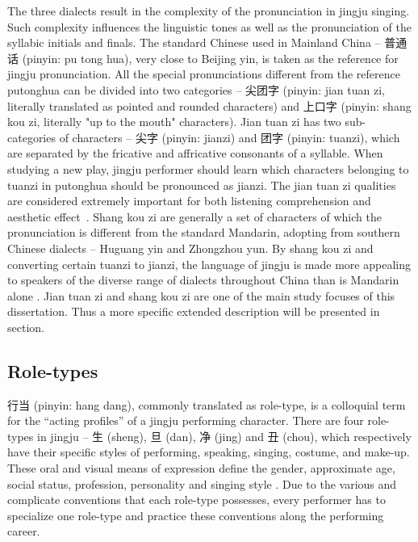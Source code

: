 The three dialects result in the complexity of the pronunciation in jingju singing. Such complexity influences the linguistic tones as well as the pronunciation of the syllabic initials and finals. The standard Chinese used in Mainland China -- 普通话 (pinyin: pu tong hua), very close to Beijing yin, is taken as the reference for jingju pronunciation. All the special pronunciations different from the reference putonghua can be divided into two categories -- 尖团字 (pinyin: jian tuan zi, literally translated as pointed and rounded characters) and 上口字 (pinyin: shang kou zi, literally "up to the mouth" characters). Jian tuan zi has two sub-categories of characters -- 尖字 (pinyin: jianzi) and 团字 (pinyin: tuanzi), which are separated by the fricative and affricative consonants of a syllable. When studying a new play, jingju performer should learn which characters belonging to tuanzi in putonghua should be pronounced as jianzi. The jian tuan zi qualities are considered extremely important for both listening comprehension and aesthetic effect \cite{Repetto2018}. Shang kou zi are generally a set of characters of which the pronunciation is different from the standard Mandarin, adopting from southern Chinese dialects -- Huguang yin and Zhongzhou yun. By shang kou zi and converting certain tuanzi to jianzi, the language of jingju is made more appealing to speakers of the diverse range of dialects throughout China than is Mandarin alone \cite{Wichmann1991a}. Jian tuan zi and shang kou zi are one of the main study focuses of this dissertation. Thus a more specific extended description will be presented in section. 

\subsection{Role-types}

行当 (pinyin: hang dang), commonly translated as role-type, is a colloquial term for the “acting profiles” of a jingju performing character. There are four role-types in jingju -- 生 (sheng), 旦 (dan), 净 (jing) and 丑 (chou), which respectively have their specific styles of performing, speaking, singing, costume, and make-up. These oral and visual means of expression define the gender, approximate age, social status, profession, personality and singing style \cite{Yung1989a}. Due to the various and complicate conventions that each role-type possesses, every performer has to specialize one role-type and practice these conventions along the performing career. 

